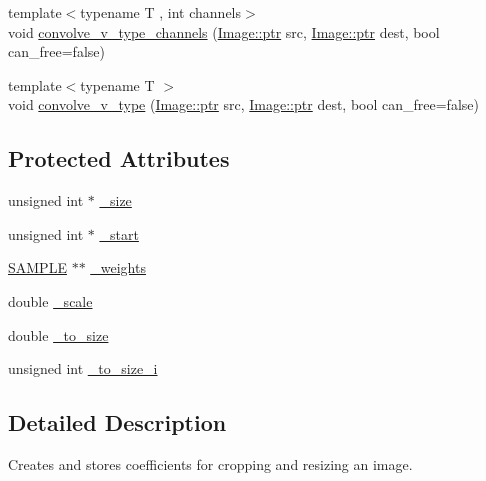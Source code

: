\begin{DoxyCompactItemize}
\item 
{\footnotesize template$<$typename T , int channels$>$ }\\void \hyperlink{class_photo_finish_1_1_kernel1_dvar_ab566b386272be4da7254fb11565cb81d}{convolve\+\_\+v\+\_\+type\+\_\+channels} (\hyperlink{class_photo_finish_1_1_image_ab336203305ed3a1397d7245063353b5a}{Image\+::ptr} src, \hyperlink{class_photo_finish_1_1_image_ab336203305ed3a1397d7245063353b5a}{Image\+::ptr} dest, bool can\+\_\+free=false)
\item 
{\footnotesize template$<$typename T $>$ }\\void \hyperlink{class_photo_finish_1_1_kernel1_dvar_a8e3a75a667009d41d65b8218d6d67a6f}{convolve\+\_\+v\+\_\+type} (\hyperlink{class_photo_finish_1_1_image_ab336203305ed3a1397d7245063353b5a}{Image\+::ptr} src, \hyperlink{class_photo_finish_1_1_image_ab336203305ed3a1397d7245063353b5a}{Image\+::ptr} dest, bool can\+\_\+free=false)
\end{DoxyCompactItemize}
\subsection*{Protected Attributes}
\begin{DoxyCompactItemize}
\item 
unsigned int $\ast$ \hyperlink{class_photo_finish_1_1_kernel1_dvar_a6d3dc2d40a03ecf36e6962897649dd2d}{\+\_\+size}
\item 
unsigned int $\ast$ \hyperlink{class_photo_finish_1_1_kernel1_dvar_a6f31233e54f5eea8b23795ce0f8fd0d9}{\+\_\+start}
\item 
\hyperlink{sample_8h_afc597c76b4f04a2da506a240d51d89a0}{S\+A\+M\+P\+LE} $\ast$$\ast$ \hyperlink{class_photo_finish_1_1_kernel1_dvar_ac75e5c7bd6fdbf5c645c6504b938ed97}{\+\_\+weights}
\item 
double \hyperlink{class_photo_finish_1_1_kernel1_dvar_a470873e770faba78833b98a6541fd014}{\+\_\+scale}
\item 
double \hyperlink{class_photo_finish_1_1_kernel1_dvar_aa28c28edc0d8c2fefb15efb0516b5c0b}{\+\_\+to\+\_\+size}
\item 
unsigned int \hyperlink{class_photo_finish_1_1_kernel1_dvar_a0d5bc69e7ee21e60620a348092b3c5f2}{\+\_\+to\+\_\+size\+\_\+i}
\end{DoxyCompactItemize}


\subsection{Detailed Description}
Creates and stores coefficients for cropping and resizing an image. 


